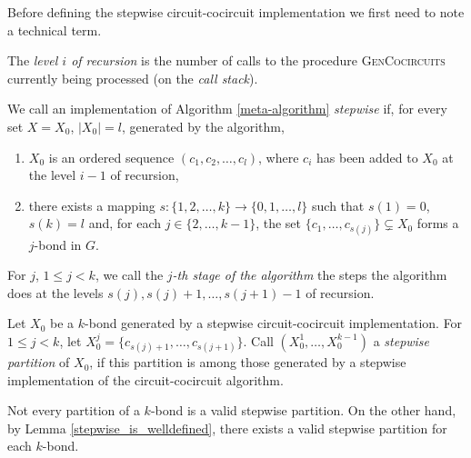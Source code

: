 Before defining the stepwise circuit-cocircuit implementation we first need to note a technical term.

\begin{note}
	The \textit{level $i$ of recursion} is the number of calls to the procedure \textsc{GenCocircuits} currently being processed (on the \textit{call stack}).
\end{note}

\begin{defn}
	\label{stepwise_scheme}

	We call an implementation of Algorithm \ref{meta-algorithm} \textit{stepwise} if, for every set $X = X_0$, $\lvert X_0 \rvert = l$, generated by the algorithm,

	\begin{enumerate}
		\item $X_0$ is an ordered sequence $(c_1, c_2,\ldots,c_l)$, where $c_i$ has been \linebreak added to $X_0$ at the level $i-1$ of recursion,
		\item there exists a mapping $s : \{1,2,\ldots,k\} \rightarrow \{0,1,\ldots,l\}$ such that $s(1) = 0$, $s(k) = l$ and, for each $j \in \{2,\ldots,k-1\}$, the set $\{c_1,\ldots,c_{s(j)}\} \subsetneq X_0$ forms a $j$-bond in $G$.
	\end{enumerate}

	\noindent For $j$, $1 \leq j < k$, we call the \textit{$j$-th stage of the algorithm} the steps the algorithm does at the levels $s(j), s(j) + 1,\ldots, s(j+1)-1$ of recursion.

\end{defn}

\begin{defn}
	\label{defn:stepwise_partition}
	Let $X_0$ be a $k$-bond generated by a stepwise circuit-cocircuit implementation. For $1 \leq j < k$, let $X_0^{j} = \{c_{s(j)+1},\ldots,c_{s(j+1)}\}$. Call $(X_0^1, \dots, X_0^{k-1})$ a \textit{stepwise partition} of $X_0$, if this partition is among those generated by a stepwise implementation of the circuit-cocircuit algorithm.
\end{defn}

\begin{note}
Not every partition of a $k$-bond is a valid stepwise partition. On the other hand, by Lemma \ref{stepwise_is_welldefined}, there exists a valid stepwise partition for each $k$-bond.
\end{note}


